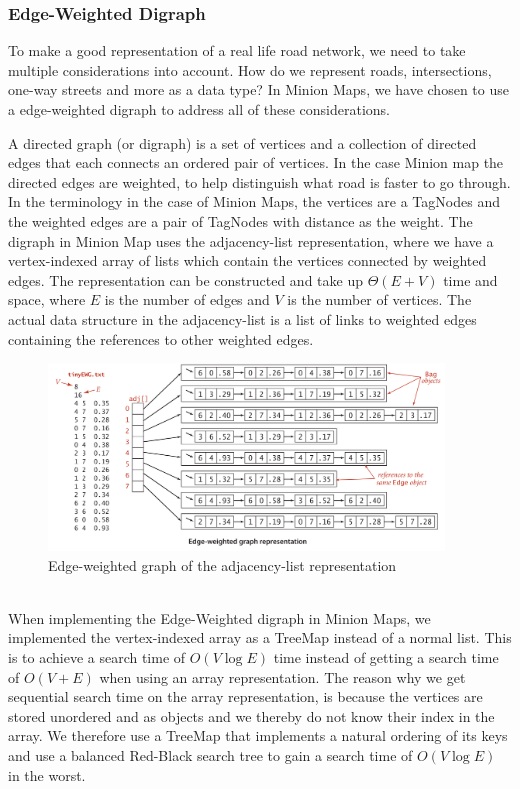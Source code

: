 \subsubsection{Edge-Weighted Digraph}
To make a good representation of a real life road network, we need to take multiple considerations into account. How do we represent roads, intersections, one-way streets and more as a data type? In Minion Maps, we have chosen to use a edge-weighted digraph to address all of these considerations.\par 
A directed graph (or digraph) is a set of vertices and a collection of directed edges that each connects an ordered pair of vertices. In the case Minion map the directed edges are weighted, to help distinguish what road is faster to go through. In the terminology in the case of Minion Maps, the vertices are a TagNodes and the weighted edges are a pair of TagNodes with distance as the weight. The digraph in Minion Map uses the adjacency-list representation, where we have a vertex-indexed array of lists which contain the vertices connected by weighted edges. The representation can be constructed and take up $\Theta({E+V})$ time and space, where $E$ is the number of edges and $V$ is the number of vertices. 
The actual data structure in the adjacency-list is a list of links to weighted edges containing the references to other weighted edges. 
\begin{figure}[ht]%
  \centering
  \includegraphics[width=10.5cm]{docs/material/edgeWeightedGraphRepresentation.png}%
  \caption{\centering Edge-weighted graph of the adjacency-list representation\cite{AlgoBook/4.3}}\label{graph/AdjList}%
\end{figure}\\
When implementing the Edge-Weighted digraph in Minion Maps, we implemented the vertex-indexed array as a TreeMap instead of a normal list. This is to achieve a search time of $O(V \log E)$ time instead of getting a search time of $O(V+E)$ when using an array representation.\cite{graph/geeksforgeeks} The reason why we get sequential search time on the array representation, is because the vertices are stored unordered and as objects and we thereby do not know their index in the array. We therefore use a TreeMap that implements a natural ordering of its keys and use a balanced Red-Black search tree to gain a search time of $O(V \log E)$ in the worst.

